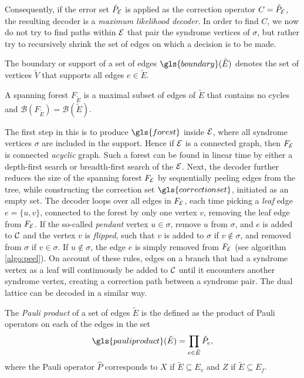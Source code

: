 Consequently, if the error set $\tilde{P}_{\mathcal{E}}$ is applied as the correction operator $C=\tilde{P}_{\mathcal{E}}$, the resulting decoder is a \emph{maximum likelihood decoder}. In order to find $C$, we now do not try to find paths within $\mathcal{E}$ that pair the syndrome vertices of $\sigma$, but rather try to recursively shrink the set of edges on which a decision is to be made. 
\begin{definition}\label{def:boundaryofedges}
  The boundary or support of a set of edges $\gls{boundary}(\tilde{E})$ denotes the set of vertices $\tilde{V}$ that supports all edges $e\in \tilde{E}$.
\end{definition}
\begin{definition}\label{def:forest}
  A spanning forest $F_{\tilde{E}}$ is a maximal subset of edges of $\tilde{E}$ that contains no cycles and $\mathscr{B}(F_{\tilde{E}}) = \mathscr{B}(\tilde{E})$.
\end{definition}
The first step in this is to produce $\gls{forest}$ inside $\mathcal{E}$, where all syndrome vertices $\sigma$ are included in the support. Hence if $\mathcal{E}$ is a connected graph, then $F_{\mathcal{E}}$ is connected \emph{acyclic} graph. Such a forest can be found in linear time by either a depth-first search or breadth-first search of the $\mathcal{E}$. Next, the decoder further reduces the size of the spanning forest $F_{\mathcal{E}}$ by sequentially peeling edges from the tree, while constructing the correction set $\gls{correctionset}$, initiated as an empty set. The decoder loops over all edges in $F_{\mathcal{E}}$, each time picking a \emph{leaf} edge $e = \{u,v\}$, connected to the forest by only one vertex $v$, removing the leaf edge from $F_{\mathcal{E}}$. If the so-called \emph{pendant} vertex $u\in\sigma$, remove $u$ from $\sigma$, and $e$ is added to $\mathcal{C}$ and the vertex $v$ is \emph{flipped}, such that $v$ is added to $\sigma$ if $v \notin \sigma$, and removed from $\sigma$ if $v\in\sigma$.  If $u\notin\sigma$, the edge $e$ is simply removed from $F_{\mathcal{E}}$ (see algorithm \ref{algo:peel}). On account of these rules, edges on a branch that had a syndrome vertex as a leaf will continuously be added to $\mathcal{C}$ until it encounters another syndrome vertex, creating a correction path between a syndrome pair. The dual lattice can be decoded in a similar way.
\begin{definition}
  The \emph{Pauli product} of a set of edges $\tilde{E}$ is the defined as the product of Pauli operators on each of the edges in the set
  \begin{equation}
    \gls{pauliproduct}(\tilde{E}) = \prod_{e\in \tilde{E}} \hat{P}_e,
  \end{equation}
  where the Pauli operator $\hat{P}$ corresponds to $X$ if $\tilde{E}\subseteq E_v$ and $Z$ if $\tilde{E}\subseteq E_f$. 
\end{definition}
